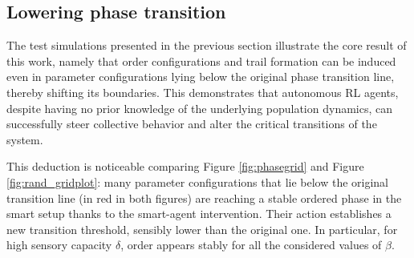 \documentclass[openacc]{rsproca_new}
\begin{document}

\subsection{Lowering phase transition}
The test simulations presented in the previous section illustrate the core result of this work, namely that order configurations and trail formation can be induced even in parameter configurations lying below the original phase transition line, thereby shifting its boundaries. This demonstrates that autonomous RL agents, despite having no prior knowledge of the underlying population dynamics, can successfully steer collective behavior and alter the critical transitions of the system.

This deduction is noticeable comparing Figure \ref{fig:phasegrid} and Figure \ref{fig:rand_gridplot}: many parameter configurations that lie below the original transition line (in red in both figures) are reaching a stable ordered phase in the smart setup thanks to the smart-agent intervention. Their action establishes a new transition threshold, sensibly lower than the original one. In particular, for high sensory capacity $\delta$, order appears stably for all the considered values of $\beta$.
\end{document}
